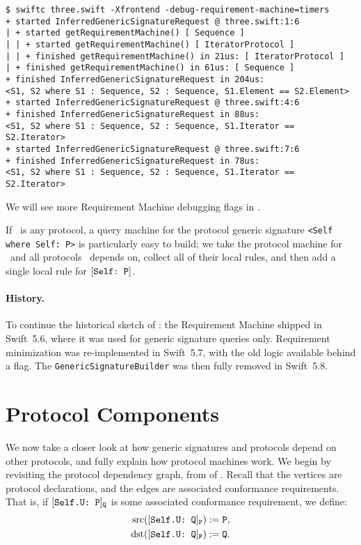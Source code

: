 \documentclass[../generics]{subfiles}
\begin{document}
\begin{example}
\begin{Verbatim}[fontsize=\footnotesize,numbers=none]
$ swiftc three.swift -Xfrontend -debug-requirement-machine=timers
+ started InferredGenericSignatureRequest @ three.swift:1:6
| + started getRequirementMachine() [ Sequence ]
| | + started getRequirementMachine() [ IteratorProtocol ]
| | + finished getRequirementMachine() in 21us: [ IteratorProtocol ]
| + finished getRequirementMachine() in 61us: [ Sequence ]
+ finished InferredGenericSignatureRequest in 204us:
<S1, S2 where S1 : Sequence, S2 : Sequence, S1.Element == S2.Element>
+ started InferredGenericSignatureRequest @ three.swift:4:6
+ finished InferredGenericSignatureRequest in 88us:
<S1, S2 where S1 : Sequence, S2 : Sequence, S1.Iterator == S2.Iterator>
+ started InferredGenericSignatureRequest @ three.swift:7:6
+ finished InferredGenericSignatureRequest in 78us:
<S1, S2 where S1 : Sequence, S2 : Sequence, S1.Iterator == S2.Iterator>
\end{Verbatim}
We will see more Requirement Machine debugging flags in .
\end{example}

\begin{example}
If \tP\ is any protocol, a query machine for the protocol generic signature \verb|<Self where Self: P>| is particularly easy to build; we take the protocol machine for \tP\ and all protocols \tP\ depends on, collect all of their local rules, and then add a single local rule for $[\texttt{Self:~P}]$.
\end{example}

\paragraph{History.}
To continue the historical sketch of : the Requirement Machine shipped in Swift~5.6, where it was used for generic signature queries only. Requirement minimization was re-implemented in Swift~5.7, with the old logic available behind a flag. The \texttt{GenericSignatureBuilder} was then fully removed in Swift~5.8.

\section{Protocol Components}\label{protocol component}

We now take a closer look at how generic signatures and protocols depend on other protocols, and fully explain how protocol machines work. We begin by revisiting the protocol dependency graph, from  of . Recall that the vertices are protocol declarations, and the edges are associated conformance requirements. That is, if $[\texttt{Self.U:~P}]_{\texttt{Q}}$ is some associated conformance requirement, we define:
\begin{align*}
\operatorname{src}([\texttt{Self.U:~Q}]_{\texttt{P}})&:=\texttt{P},\\
\operatorname{dst}([\texttt{Self.U:~Q}]_{\texttt{P}})&:=\texttt{Q}.
\end{align*}
\end{document}
